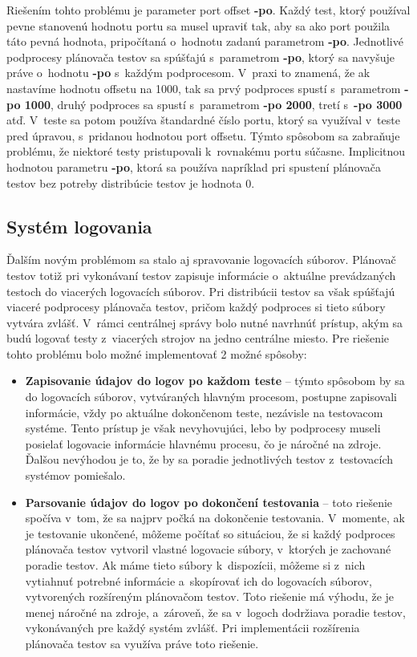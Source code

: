 Riešením tohto problému je parameter port offset \textbf{-po}. 
Každý test, ktorý používal pevne stanovenú hodnotu portu sa musel 
upraviť tak, aby sa ako port použila táto pevná hodnota, pripočítaná 
o~hodnotu zadanú parametrom \textbf{-po}.
Jednotlivé podprocesy plánovača testov sa spúšťajú s~parametrom 
\textbf{-po}, ktorý sa navyšuje práve o~hodnotu \textbf{-po} 
s~každým podprocesom. V~praxi to znamená, že ak nastavíme hodnotu 
offsetu na 1000, tak sa prvý podproces spustí s~parametrom
\textbf{-po 1000}, druhý podproces sa spustí s~parametrom \textbf{-po 2000}, 
tretí s~\textbf{-po 3000} atď. V~teste sa potom používa štandardné 
číslo portu, ktorý sa využíval v~teste pred úpravou, s~pridanou hodnotou 
port offsetu. Týmto spôsobom sa zabraňuje problému, že niektoré testy 
pristupovali k~rovnakému portu súčasne. Implicitnou hodnotou parametru 
\textbf{-po}, ktorá sa používa napríklad pri spustení plánovača testov
bez potreby distribúcie testov je hodnota 0. 

\subsection*{Systém logovania}
Ďalším novým problémom sa stalo aj spravovanie logovacích súborov. 
Plánovač testov totiž pri vykonávaní testov zapisuje informácie 
o~aktuálne prevádzaných testoch do viacerých logovacích súborov.
Pri distribúcii testov sa však spúšťajú viaceré podprocesy plánovača 
testov, pričom každý podproces si tieto súbory vytvára zvlášť. 
V~rámci centrálnej správy bolo nutné navrhnúť prístup, akým sa budú
logovať testy z~viacerých strojov na jedno centrálne miesto.
Pre riešenie tohto problému bolo možné implementovať 2 možné spôsoby:
\begin{itemize}
\item \textbf{Zapisovanie údajov do logov po každom teste} -- 
týmto spôsobom by sa do logovacích súborov, vytváraných hlavným procesom,
postupne zapisovali informácie, vždy po aktuálne dokončenom teste, 
nezávisle na testovacom systéme. Tento prístup je však nevyhovujúci, 
lebo by podprocesy museli posielať logovacie informácie hlavnému procesu, 
čo je náročné na zdroje. Ďalšou nevýhodou je to, že by sa poradie 
jednotlivých testov z~testovacích systémov pomiešalo.
\item \textbf{Parsovanie údajov do logov po dokončení testovania} -- 
toto riešenie spočíva v~tom, že sa najprv počká na dokončenie testovania. 
V~momente, ak je testovanie ukončené, môžeme počítať so situáciou,
že si každý podproces plánovača testov vytvoril vlastné logovacie súbory, 
v~ktorých je zachované poradie testov. Ak máme tieto súbory k~dispozícii, 
môžeme si z~nich vytiahnuť potrebné informácie a~skopírovať ich do 
logovacích súborov, vytvorených rozšíreným plánovačom testov. 
Toto riešenie má výhodu, že je menej náročné na zdroje, a~zároveň,
že sa v~logoch dodržiava poradie testov, vykonávaných pre každý systém zvlášť. 
Pri implementácii rozšírenia plánovača testov sa využíva práve toto riešenie.
\end{itemize} 

